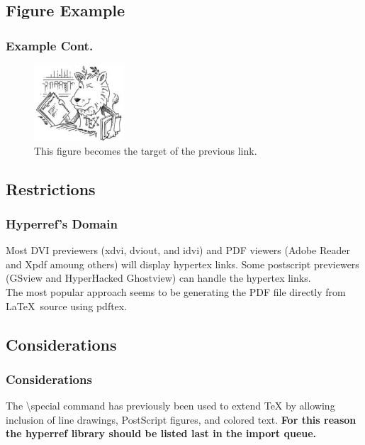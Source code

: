 \documentclass[10pt]{beamer}
\begin{document}
\subsection{Figure Example}
\begin{frame}[fragile]
\frametitle{Example Cont.}
\begin{figure}[htbp]
  \centering
  \includegraphics[width=0.3\textwidth]{lion.png}
  \caption[The TeX mascott]{\large This figure becomes the target of the previous link.}
  \label{fig:TeX}
\end{figure}
\end{frame}

\subsection{Restrictions}
\begin{frame}[fragile]
\frametitle{Hyperref's Domain}
Most DVI previewers (xdvi, dviout, and idvi) and PDF viewers (Adobe Reader and Xpdf amoung others) will display hypertex links.
Some postscript previewers (GSview and HyperHacked Ghostview) can handle the hypertex links. 
\\[10pt]
The most popular approach seems to be generating the PDF file directly from \LaTeX\ source using pdftex.
\end{frame}

\subsection{Considerations}
\begin{frame}[fragile]
\frametitle{Considerations}
The \textbackslash special command has previously been used to extend TeX by allowing inclusion of line drawings, PostScript figures, and colored text. \textbf{For this reason the hyperref library should be listed last in the import queue.}
\end{frame}

\end{document}
